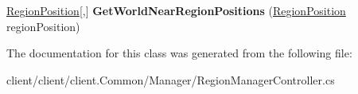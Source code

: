 \begin{DoxyCompactItemize}
\item 
\hypertarget{classClient_1_1Common_1_1Manager_1_1RegionManagerController_a7d1078b11690bd0b9d713fe30f10427c}{\hyperlink{classCore_1_1Models_1_1RegionPosition}{Region\-Position}\mbox{[},\mbox{]} {\bfseries Get\-World\-Near\-Region\-Positions} (\hyperlink{classCore_1_1Models_1_1RegionPosition}{Region\-Position} region\-Position)}\label{classClient_1_1Common_1_1Manager_1_1RegionManagerController_a7d1078b11690bd0b9d713fe30f10427c}

\end{DoxyCompactItemize}


The documentation for this class was generated from the following file\-:\begin{DoxyCompactItemize}
\item 
client/client/client.\-Common/\-Manager/Region\-Manager\-Controller.\-cs\end{DoxyCompactItemize}
